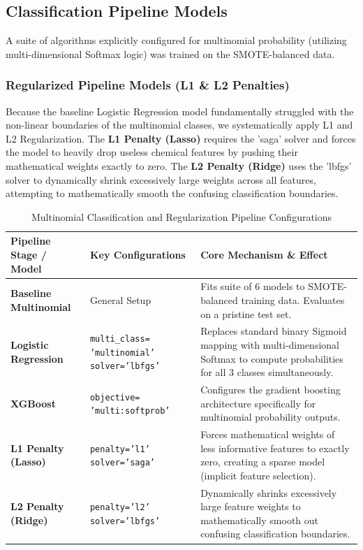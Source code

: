 \documentclass[12pt, a4paper]{article}
\begin{document}
\subsection{Classification Pipeline Models}
A suite of algorithms explicitly configured for multinomial probability (utilizing multi-dimensional Softmax logic) was trained on the SMOTE-balanced data.

\subsubsection*{Regularized Pipeline Models (L1 \& L2 Penalties)}
Because the baseline Logistic Regression model fundamentally struggled with the non-linear boundaries of the multinomial classes, we systematically apply L1 and L2 Regularization. The \textbf{L1 Penalty (Lasso)} requires the 'saga' solver and forces the model to heavily drop useless chemical features by pushing their mathematical weights exactly to zero. The \textbf{L2 Penalty (Ridge)} uses the 'lbfgs' solver to dynamically shrink excessively large weights across all features, attempting to mathematically smooth the confusing classification boundaries.

\begin{table}[H]
    \centering
    \caption{Multinomial Classification and Regularization Pipeline Configurations}
    \renewcommand{\arraystretch}{1.4}
    \begin{tabular}{@{}lp{4.5cm}p{6.5cm}@{}}
        \toprule
        \textbf{Pipeline Stage / Model} & \textbf{Key Configurations} & \textbf{Core Mechanism \& Effect} \\
        \midrule
        \textbf{Baseline Multinomial} & General Setup & Fits suite of 6 models to SMOTE-balanced training data. Evaluates on a pristine test set. \\
        \textbf{Logistic Regression} & \texttt{multi\_class=} \newline \texttt{'multinomial'} \newline \texttt{solver='lbfgs'} & Replaces standard binary Sigmoid mapping with multi-dimensional Softmax to compute probabilities for all 3 classes simultaneously. \\
        \textbf{XGBoost} & \texttt{objective=} \newline \texttt{'multi:softprob'} & Configures the gradient boosting architecture specifically for multinomial probability outputs. \\
        \midrule
        \textbf{L1 Penalty (Lasso)} & \texttt{penalty='l1'} \newline \texttt{solver='saga'} & Forces mathematical weights of less informative features to exactly zero, creating a sparse model (implicit feature selection). \\
        \textbf{L2 Penalty (Ridge)} & \texttt{penalty='l2'} \newline \texttt{solver='lbfgs'} & Dynamically shrinks excessively large feature weights to mathematically smooth out confusing classification boundaries. \\
        \bottomrule
    \end{tabular}
\end{table}
\end{document}

